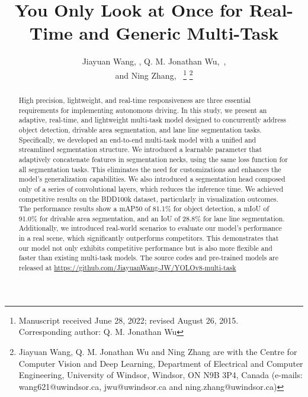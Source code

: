 \documentclass[lettersize,journal]{IEEEtran}
\begin{document}
\title{You Only Look at Once for Real-Time and Generic Multi-Task}

\author{Jiayuan Wang, , Q. M. Jonathan Wu,~,\\ and Ning Zhang,~
\thanks{Manuscript received June 28, 2022; revised August 26, 2015.\\
Corresponding author: Q. M. Jonathan Wu }
\thanks{Jiayuan Wang, Q. M. Jonathan Wu and Ning Zhang are with the Centre for Computer Vision and Deep Learning, Department of Electrical and Computer Engineering, University of Windsor, Windsor, ON N9B 3P4, Canada (e-mails: wang621@uwindsor.ca, jwu@uwindsor.ca and ning.zhang@uwindsor.ca)}}




\maketitle

\begin{abstract}
High precision, lightweight, and real-time responsiveness are three essential requirements for implementing autonomous driving. In this study, we present an adaptive, real-time, and lightweight multi-task model designed to concurrently address object detection, drivable area segmentation, and lane line segmentation tasks. Specifically, we developed an end-to-end multi-task model with a unified and streamlined segmentation structure. We introduced a learnable parameter that adaptively concatenate features in segmentation necks, using the same loss function for all segmentation tasks. This eliminates the need for customizations and enhances the model's generalization capabilities. We also introduced a segmentation head composed only of a series of convolutional layers, which reduces the inference time. We achieved competitive results on the BDD100k dataset, particularly in visualization outcomes. The performance results show a mAP50 of 81.1\% for object detection, a mIoU of 91.0\% for drivable area segmentation, and an IoU of 28.8\% for lane line segmentation. Additionally, we introduced real-world scenarios to evaluate our model's performance in a real scene, which significantly outperforms competitors. This demonstrates that our model not only exhibits competitive performance but is also more flexible and faster than existing multi-task models. The source codes and pre-trained models are released at \url{https://github.com/JiayuanWang-JW/YOLOv8-multi-task}
\end{abstract}
\end{document}
